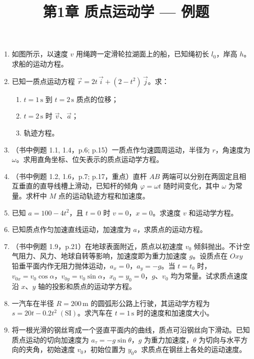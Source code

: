 \documentclass{ctexart}
\title{\textbf{第1章 质点运动学} --- 例题}
\author{}
\date{}
\begin{document}
\maketitle

\begin{enumerate}

\item 如图所示，以速度 $v$ 用绳跨一定滑轮拉湖面上的船，已知绳初长 $l_0$，岸高 $h$。求船的运动方程。

\item 已知一质点运动方程 $\vec{r} = 2t\,\vec{i} + (2 - t^{2})\,\vec{j}$。求：
\begin{enumerate}
  \item $t = 1\,\text{s}$ 到 $t = 2\,\text{s}$ 质点的位移；
  \item $t = 2\,\text{s}$ 时 $\vec{v}$、$\vec{a}$；
  \item 轨迹方程。
\end{enumerate}

\item（书中例题 1.1, 1.4，p.6; p.15）一质点作匀速圆周运动，半径为 $r$，角速度为 $\omega$。求用直角坐标、位矢表示的质点运动学方程。

\item（书中例题 1.2, 1.6，p.7; p.17，重点）直杆 $AB$ 两端可以分别在两固定且相互垂直的直导线槽上滑动，已知杆的倾角 $\varphi = \omega t$ 随时间变化，其中 $\omega$ 为常量。求杆中 $M$ 点的运动轨迹方程和加速度。

\item 已知 $a = 100 - 4t^{2}$，且 $t = 0$ 时 $v = 0$，$x = 0$。求速度 $v$ 和运动学方程。

\item 已知质点作匀加速直线运动，加速度为 $a$，求质点的运动方程。

\item（书中例题 1.9，p.21）在地球表面附近，质点以初速度 $v_0$ 倾斜抛出。不计空气阻力、风力、地球自转等影响，加速度即为重力加速度 $g$。设质点在 $Oxy$ 铅垂平面内作无阻力抛体运动，$a_x = 0$，$a_y = -g$。当 $t = t_0$ 时，$v_{0x} = v_0\cos\alpha$，$v_{0y} = v_0\sin\alpha$，$x_0 = y_0 = 0$，$g$、$v_0$ 均为常量。试求质点速度沿 $x$、$y$ 轴的投影和质点的运动学方程。

\item 一汽车在半径 $R = 200\,\text{m}$ 的圆弧形公路上行驶，其运动学方程为 $s = 20t - 0.2t^{2}\;(\text{SI})$。求汽车在 $t = 1\,\text{s}$ 时的速度和加速度大小。

\item 将一根光滑的钢丝弯成一个竖直平面内的曲线，质点可沿钢丝向下滑动。已知质点运动的切向加速度为 $a_{\tau} = -g\sin\theta$，$g$ 为重力加速度，$\theta$ 为切向与水平方向的夹角，初始速度 $v_0$，初始位置为 $y_0$。求质点在钢丝上各处的运动速度。


\end{enumerate}
\end{document}
